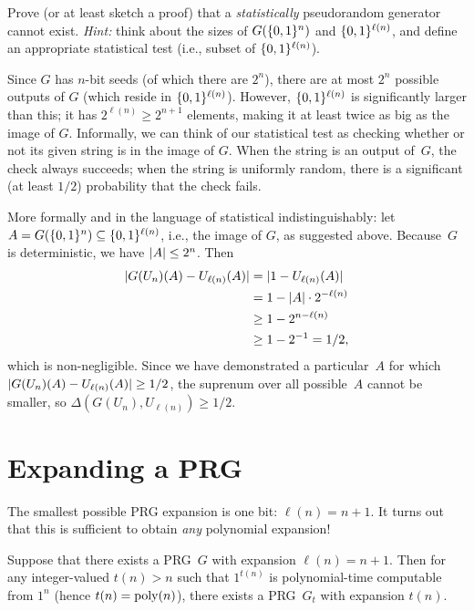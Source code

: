 \documentclass[11pt]{article}
\begin{document}
\begin{question}
  Prove (or at least sketch a proof) that a \emph{statistically} pseudorandom generator cannot exist.
  \emph{Hint:} think about the sizes of $G(\{0,1\}^n)$ and $\{0,1\}^{\ell(n)}$, and define an appropriate statistical test (i.e., subset of $\{0,1\}^{\ell(n)}$).
\end{question}

\begin{answer}
  Since $G$ has $n$-bit seeds (of which there are $2^n$), there are at most $2^n$ possible outputs of $G$ (which reside in $\{0,1\}^{\ell(n)}$).
  However, $\{0,1\}^{\ell(n)}$ is significantly larger than this; it has $2^{\ell(n)} \geq 2^{n+1}$ elements, making it at least twice as big as the image of \(G\).
  Informally, we can think of our statistical test as checking whether or not its given string is in the image of $G$.
  When the string is an output of~$G$, the check always succeeds; when the string is uniformly random, there is a significant (at least $1/2$) probability that the check fails.

  More formally and in the language of statistical indistinguishably: let $A = G(\{0,1\}^n) \subseteq \{0,1\}^{\ell(n)}$, i.e., the image of $G$, as suggested above.
  Because~$G$ is deterministic, we have $\lvert A\rvert \leq 2^{n}$.
  Then
  \[
    \begin{aligned}
      \lvert G(U_n)(A) - U_{\ell(n)}(A)\rvert
      &= \lvert1 - U_{\ell(n)}(A)\rvert \\
      &= 1 - \lvert A\rvert \cdot 2^{-\ell(n)}  \\
      &\geq 1 - 2^{n-\ell(n)} \\
      &\geq 1 - 2^{-1} = 1/2,
    \end{aligned}
  \]
  which is non-negligible.
  Since we have demonstrated a particular~$A$ for which $\lvert G(U_n)(A) - U_{\ell(n)}(A)\rvert \geq 1/2$, the suprenum over all possible~$A$ cannot be smaller, so $\Delta(G(U_n), U_{\ell(n)}) \geq 1/2$.
\end{answer}

\section{Expanding a PRG}
\label{sec:expanding-prg}

The smallest possible PRG expansion is one bit: $\ell(n)=n+1$.
It turns out that this is sufficient to obtain \emph{any} polynomial expansion!

\begin{theorem}
  \label{thm:prg-expansion}
  Suppose that there exists a PRG~$G$ with expansion $\ell(n)=n+1$.
  Then for any integer-valued $t(n)>n$ such that $1^{t(n)}$ is polynomial-time computable from $1^n$ (hence $t(n)=\operatorname{poly}(n)$), there exists a PRG~$G_t$ with expansion $t(n)$.
\end{theorem}
\end{document}
